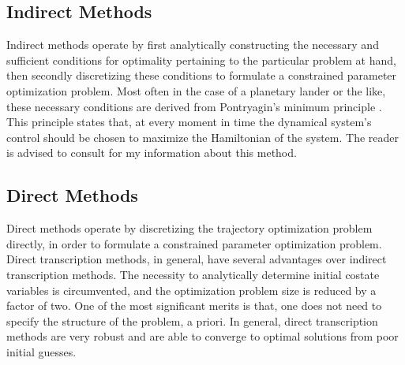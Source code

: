 \documentclass{article}
\begin{document}
\subsection{Indirect Methods}
Indirect methods operate by first analytically constructing the necessary and sufficient conditions for optimality pertaining to the particular problem at hand, then secondly discretizing these conditions to formulate a constrained parameter optimization problem. Most often in the case of a planetary lander or the like, these necessary conditions are derived from Pontryagin's minimum principle \cite{Grabowski2009}. This principle states that, at every moment in time the dynamical system's control should be chosen to maximize the Hamiltonian of the system. The reader is advised to consult \cite{VonStryk1992} for my information about this method. 
\subsection{Direct Methods}
Direct methods operate by discretizing the trajectory optimization problem directly, in order to formulate a constrained parameter optimization problem. Direct transcription methods, in general, have several advantages over indirect transcription methods. The necessity to analytically determine initial costate variables is circumvented, and the optimization problem size is reduced by a factor of two. One of the most significant merits is that, one does not need to specify the structure of the problem, a priori. In general, direct transcription methods are very robust and are able to converge to optimal solutions from poor initial guesses.
\end{document}

